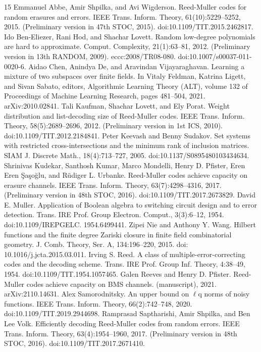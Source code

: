 \documentclass[10pt,a4paper]{article}
\begin{document}
\begin{thebibliography}{15}
 Emmanuel Abbe, Amir Shpilka, and Avi Wigderson. Reed-Muller codes for random erasures and errors. IEEE Trans. Inform. Theory, 61(10):5229–5252, 2015. (Preliminary version in 47th STOC, 2015). doi:10.1109/TIT.2015.2462817.
 Ido Ben-Eliezer, Rani Hod, and Shachar Lovett. Random low-degree polynomials are hard to approximate. Comput. Complexity, 21(1):63–81, 2012. (Preliminary version in 13th RANDOM, 2009). eccc:2008/TR08-080. doi:10.1007/s00037-011-0020-6.
 Aidao Chen, Anindya De, and Aravindan Vijayaraghavan. Learning a mixture of two subspaces over finite fields. In Vitaly Feldman, Katrina Ligett, and Sivan Sabato, editors, Algorithmic Learning Theory (ALT), volume 132 of Proceedings of Machine Learning Research, pages 481–504, 2021. arXiv:2010.02841.
 Tali Kaufman, Shachar Lovett, and Ely Porat. Weight distribution and list-decoding size of Reed-Muller codes. IEEE Trans. Inform. Theory, 58(5):2689–2696, 2012. (Preliminary version in 1st ICS, 2010). doi:10.1109/TIT.2012.2184841.
 Peter Keevash and Benny Sudakov. Set systems with restricted cross-intersections and the minimum rank of inclusion matrices. SIAM J. Discrete Math., 18(4):713–727, 2005. doi:10.1137/S0895480103434634.
 Shrinivas Kudekar, Santhosh Kumar, Marco Mondelli, Henry D. Pfister, Eren Eren Şaşoğlu, and Rüdiger L. Urbanke. Reed-Muller codes achieve capacity on erasure channels. IEEE Trans. Inform. Theory, 63(7):4298–4316, 2017. (Preliminary version in 48th STOC, 2016). doi:10.1109/TIT.2017.2673829.
 David E. Muller. Application of Boolean algebra to switching circuit design and to error detection. Trans. IRE Prof. Group Electron. Comput., 3(3):6–12, 1954. doi:10.1109/IREPGELC. 1954.6499441.
 Zipei Nie and Anthony Y. Wang. Hilbert functions and the finite degree Zariski closure in finite field combinatorial geometry. J. Comb. Theory, Ser. A, 134:196–220, 2015. doi: 10.1016/j.jcta.2015.03.011.
 Irving S. Reed. A class of multiple-error-correcting codes and the decoding scheme. Trans. IRE Prof. Group Inf. Theory, 4:38–49, 1954. doi:10.1109/TIT.1954.1057465.
 Galen Reeves and Henry D. Pfister. Reed-Muller codes achieve capacity on BMS channels. (manuscript), 2021. arXiv:2110.14631.
 Alex Samorodnitsky. An upper bound on $\ell$q norms of noisy functions. IEEE Trans. Inform. Theory, 66(2):742–748, 2020. doi:10.1109/TIT.2019.2944698.
 Ramprasad Saptharishi, Amir Shpilka, and Ben Lee Volk. Efficiently decoding Reed-Muller codes from random errors. IEEE Trans. Inform. Theory, 63(4):1954–1960, 2017. (Preliminary version in 48th STOC, 2016). doi:10.1109/TIT.2017.2671410.

\end{thebibliography}
\end{document}

